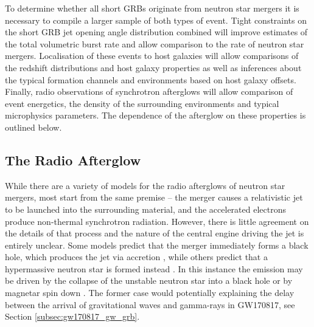 To determine whether all short GRBs originate from neutron star mergers it is necessary to compile a larger sample of both types of event. Tight constraints on the short GRB jet opening angle distribution combined will improve estimates of the total volumetric burst rate and allow comparison to the rate of neutron star mergers. Localisation of these events to host galaxies will allow comparisons of the redshift distributions and host galaxy properties as well as inferences about the typical formation channels and environments based on host galaxy offsets. Finally, radio observations of synchrotron afterglows will allow comparison of event energetics, the density of the surrounding environments and typical microphysics parameters. The dependence of the afterglow on these properties is outlined below.


\subsection{The Radio Afterglow}
\label{subsec:canonical_afterglow}
While there are a variety of models for the radio afterglows of neutron star mergers, most start from the same premise -- the merger causes a relativistic jet to be launched into the surrounding material, and the accelerated electrons produce non-thermal synchrotron radiation. However, there is little agreement on the details of that process and the nature of the central engine driving the jet is entirely unclear. Some models predict that the merger immediately forms a black hole, which produces the jet via accretion \citep[][and references therein]{2007NJPh....9...17L,2017arXiv171005931M}, while others predict that a hypermassive neutron star is formed instead \citep{2013PhRvD..88d4026H,2013MNRAS.430.1061R}. In this instance the emission may be driven by the collapse of the unstable neutron star into a black hole \citep{2017ApJ...848L..34M} or by magnetar spin down \citep{2008MNRAS.385.1455M,2012MNRAS.419.1537B}. The former case would potentially explaining the delay between the arrival of gravitational waves and gamma-rays in GW170817, see Section \ref{subsec:gw170817_gw_grb}.

